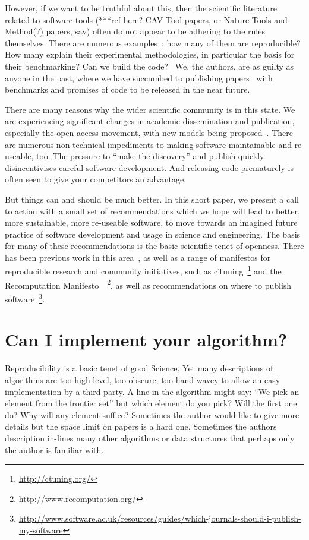\documentclass[conference]{IEEEtran}
\begin{document}
However, if we want to be truthful about this, then the scientific
literature related to software tools (***ref here? CAV Tool papers, or
Nature Tools and Method(?)  papers, say) often do not appear to be
adhering to the rules themselves. There are numerous
examples~\cite{beck-et-al:2005,prosser:2012}; how many of them are
reproducible? How many explain their experimental methodologies, in
particular the basis for their benchmarking? Can we build the
code?~\cite{collberg-et-al:2014} We, the authors, are as guilty as
anyone in the past, where we have succumbed to publishing
papers~\cite{crick-et-al:2009, Berdine2011SLAyer} with benchmarks and
promises of code to be released in the near future.

There are many reasons why the wider scientific community is in this
state. We are experiencing significant changes in academic
dissemination and publication, especially the open access movement,
with new models being
proposed~\cite{stodden-et-al:2013,fursin+dubach:2014}.  There are
numerous non-technical impediments to making software maintainable and
re-useable, too. The pressure to ``make the discovery'' and publish
quickly disincentivises careful software development. And releasing
code prematurely is often seen to give your competitors an advantage.

But things can and should be much better. In this short paper, we
present a call to action with a small set of recommendations which we
hope will lead to better, more sustainable, more re-useable software,
to move towards an imagined future practice of software development
and usage in science and engineering.  The basis for many of these
recommendations is the basic scientific tenet of openness. There has
been previous work in this
area~\cite{sim-et-al:2003,chirigati-et-al:2013}, as well as a range of
manifestos for reproducible research and community initiatives, such
as cTuning~\footnote{\url{http://ctuning.org/}} and the Recomputation
Manifesto~\cite{gent:2013}~\footnote{\url{http://www.recomputation.org/}}, as well as
recommendations on where to publish
software~\footnote{\url{http://www.software.ac.uk/resources/guides/which-journals-should-i-publish-my-software}}.


\section{Can I implement your algorithm?}

Reproducibility is a basic tenet of good Science. Yet many
descriptions of algorithms are too high-level, too obscure, too
hand-wavey to allow an easy implementation by a third party. A line in
the algorithm might say: ``We pick an element from the frontier set''
but which element do you pick? Will the first one do? Why will any
element suffice? Sometimes the author would like to give more details
but the space limit on papers is a hard one. Sometimes the authors
description in-lines many other algorithms or data structures that
perhaps only the author is familiar with.
\end{document}
